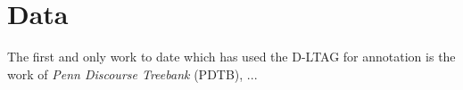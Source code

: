 \chapter{Data}

The first and only work to date which has used the D-LTAG for annotation is the work of \emph{Penn Discourse Treebank} (PDTB), ...



